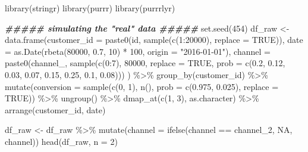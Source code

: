 \documentclass[
]{book}
\newenvironment{Shaded}{\begin{snugshade}}{\end{snugshade}}
\newcommand{\AttributeTok}[1]{\textcolor[rgb]{0.77,0.63,0.00}{#1}}
\newcommand{\ConstantTok}[1]{\textcolor[rgb]{0.00,0.00,0.00}{#1}}
\newcommand{\DecValTok}[1]{\textcolor[rgb]{0.00,0.00,0.81}{#1}}
\newcommand{\DocumentationTok}[1]{\textcolor[rgb]{0.56,0.35,0.01}{\textbf{\textit{#1}}}}
\newcommand{\FloatTok}[1]{\textcolor[rgb]{0.00,0.00,0.81}{#1}}
\newcommand{\FunctionTok}[1]{\textcolor[rgb]{0.00,0.00,0.00}{#1}}
\newcommand{\NormalTok}[1]{#1}
\newcommand{\OtherTok}[1]{\textcolor[rgb]{0.56,0.35,0.01}{#1}}
\newcommand{\SpecialCharTok}[1]{\textcolor[rgb]{0.00,0.00,0.00}{#1}}
\newcommand{\StringTok}[1]{\textcolor[rgb]{0.31,0.60,0.02}{#1}}
\begin{document}
\begin{Shaded}
\begin{Highlighting}[]
\FunctionTok{library}\NormalTok{(stringr)}
\FunctionTok{library}\NormalTok{(purrr)}
\FunctionTok{library}\NormalTok{(purrrlyr)}
 
 
\DocumentationTok{\#\#\#\#\# simulating the "real" data \#\#\#\#\#}
\FunctionTok{set.seed}\NormalTok{(}\DecValTok{454}\NormalTok{)}
\NormalTok{df\_raw }\OtherTok{\textless{}{-}} \FunctionTok{data.frame}\NormalTok{(}\AttributeTok{customer\_id =} \FunctionTok{paste0}\NormalTok{(}\StringTok{\textquotesingle{}id\textquotesingle{}}\NormalTok{, }\FunctionTok{sample}\NormalTok{(}\FunctionTok{c}\NormalTok{(}\DecValTok{1}\SpecialCharTok{:}\DecValTok{20000}\NormalTok{), }\AttributeTok{replace =} \ConstantTok{TRUE}\NormalTok{)), }\AttributeTok{date =} \FunctionTok{as.Date}\NormalTok{(}\FunctionTok{rbeta}\NormalTok{(}\DecValTok{80000}\NormalTok{, }\FloatTok{0.7}\NormalTok{, }\DecValTok{10}\NormalTok{) }\SpecialCharTok{*} \DecValTok{100}\NormalTok{, }\AttributeTok{origin =} \StringTok{"2016{-}01{-}01"}\NormalTok{), }\AttributeTok{channel =} \FunctionTok{paste0}\NormalTok{(}\StringTok{\textquotesingle{}channel\_\textquotesingle{}}\NormalTok{, }\FunctionTok{sample}\NormalTok{(}\FunctionTok{c}\NormalTok{(}\DecValTok{0}\SpecialCharTok{:}\DecValTok{7}\NormalTok{), }\DecValTok{80000}\NormalTok{, }\AttributeTok{replace =} \ConstantTok{TRUE}\NormalTok{, }\AttributeTok{prob =} \FunctionTok{c}\NormalTok{(}\FloatTok{0.2}\NormalTok{, }\FloatTok{0.12}\NormalTok{, }\FloatTok{0.03}\NormalTok{, }\FloatTok{0.07}\NormalTok{, }\FloatTok{0.15}\NormalTok{, }\FloatTok{0.25}\NormalTok{, }\FloatTok{0.1}\NormalTok{, }\FloatTok{0.08}\NormalTok{))) ) }\SpecialCharTok{\%\textgreater{}\%}
        \FunctionTok{group\_by}\NormalTok{(customer\_id) }\SpecialCharTok{\%\textgreater{}\%}
        \FunctionTok{mutate}\NormalTok{(}\AttributeTok{conversion =} \FunctionTok{sample}\NormalTok{(}\FunctionTok{c}\NormalTok{(}\DecValTok{0}\NormalTok{, }\DecValTok{1}\NormalTok{), }\FunctionTok{n}\NormalTok{(), }\AttributeTok{prob =} \FunctionTok{c}\NormalTok{(}\FloatTok{0.975}\NormalTok{, }\FloatTok{0.025}\NormalTok{), }\AttributeTok{replace =} \ConstantTok{TRUE}\NormalTok{)) }\SpecialCharTok{\%\textgreater{}\%}
        \FunctionTok{ungroup}\NormalTok{() }\SpecialCharTok{\%\textgreater{}\%}
        \FunctionTok{dmap\_at}\NormalTok{(}\FunctionTok{c}\NormalTok{(}\DecValTok{1}\NormalTok{, }\DecValTok{3}\NormalTok{), as.character) }\SpecialCharTok{\%\textgreater{}\%}
        \FunctionTok{arrange}\NormalTok{(customer\_id, date)}
 
\NormalTok{df\_raw }\OtherTok{\textless{}{-}}\NormalTok{ df\_raw }\SpecialCharTok{\%\textgreater{}\%}
        \FunctionTok{mutate}\NormalTok{(}\AttributeTok{channel =} \FunctionTok{ifelse}\NormalTok{(channel }\SpecialCharTok{==} \StringTok{\textquotesingle{}channel\_2\textquotesingle{}}\NormalTok{, }\ConstantTok{NA}\NormalTok{, channel))}
\FunctionTok{head}\NormalTok{(df\_raw, }\AttributeTok{n =} \DecValTok{2}\NormalTok{)}
\end{Highlighting}
\end{Shaded}
\end{document}
